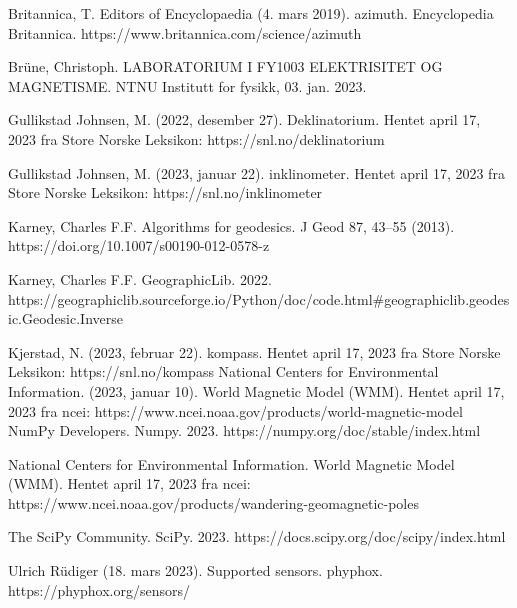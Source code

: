  Britannica, T. Editors of Encyclopaedia (4. mars 2019). azimuth. Encyclopedia Britannica. https://www.britannica.com/science/azimuth

Brüne, Christoph. LABORATORIUM I FY1003 ELEKTRISITET OG MAGNETISME. NTNU Institutt for fysikk, 03. jan. 2023.


Gullikstad Johnsen, M. (2022, desember 27). Deklinatorium. Hentet april 17, 2023 fra Store Norske Leksikon: https://snl.no/deklinatorium

Gullikstad Johnsen, M. (2023, januar 22). inklinometer. Hentet april 17, 2023 fra Store Norske Leksikon: https://snl.no/inklinometer

 Karney, Charles F.F. Algorithms for geodesics. J Geod 87, 43–55 (2013). https://doi.org/10.1007/s00190-012-0578-z

Karney, Charles F.F. GeographicLib. 2022. \\
https://geographiclib.sourceforge.io/Python/doc/code.html\#geographiclib.geodesic.Geodesic.Inverse

Kjerstad, N. (2023, februar 22). kompass. Hentet april 17, 2023 fra Store Norske Leksikon: https://snl.no/kompass
National Centers for Environmental Information. (2023, januar 10). World Magnetic Model (WMM). Hentet april 17, 
2023 fra ncei: https://www.ncei.noaa.gov/products/world-magnetic-model
 NumPy Developers. Numpy. 2023. https://numpy.org/doc/stable/index.html

National Centers for Environmental Information. World Magnetic Model (WMM). Hentet april 17, 
2023 fra ncei: https://www.ncei.noaa.gov/products/wandering-geomagnetic-poles

 The SciPy Community. SciPy. 2023. 
https://docs.scipy.org/doc/scipy/index.html

 Ulrich Rüdiger (18. mars 2023). Supported sensors. phyphox. 
https://phyphox.org/sensors/